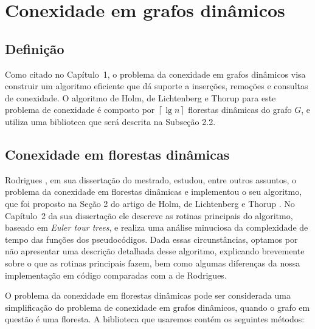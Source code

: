 

\chapter{Conexidade em grafos dinâmicos}

\enlargethispage{.8\baselineskip}

\section{Definição}

Como citado no Capítulo~1, o problema da conexidade em grafos dinâmicos visa construir um algoritmo eficiente que dá suporte a inserções, remoções e consultas de conexidade. O algoritmo de Holm, de Lichtenberg e Thorup \cite{jacob_holm} para este problema de conexidade é composto por $\left\lceil \lg n \right\rceil$ florestas dinâmicas do grafo $G$, e utiliza uma biblioteca que será descrita na Subseção 2.2. 

\section{Conexidade em florestas dinâmicas}

Rodrigues \cite{arthur}, em sua dissertação do mestrado, estudou, entre outros assuntos, o problema da conexidade em florestas dinâmicas e implementou o seu algoritmo, que foi proposto na Seção 2 do artigo de Holm, de Lichtenberg e Thorup \cite{jacob_holm}. No Capítulo~2 da sua dissertação ele descreve as rotinas principais do algoritmo, baseado em \textit{Euler tour trees}, e realiza uma análise minuciosa da complexidade de tempo das funções dos pseudocódigos. Dada essas circunstâncias, optamos por não apresentar uma descrição detalhada desse algoritmo, explicando brevemente sobre o que as rotinas principais fazem, bem como algumas diferenças da nossa implementação em código comparadas com a de Rodrigues.  

O problema da conexidade em florestas dinâmicas pode ser considerada uma simplificação do problema de conexidade em grafos dinâmicos, quando o grafo em questão é uma floresta. A biblioteca que usaremos contém os seguintes métodos:

